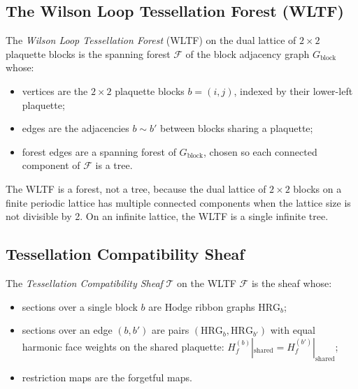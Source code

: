 \subsection{The Wilson Loop Tessellation Forest (WLTF)}
\label{ssec:wltf}

\begin{definition}
\label{def:wltf}
The \emph{Wilson Loop Tessellation Forest} (WLTF) on the dual lattice
of $2\times 2$ plaquette blocks is the spanning forest $\mathcal{F}$
of the block adjacency graph $G_{\mathrm{block}}$ whose:
\begin{itemize}
\item vertices are the $2\times 2$ plaquette blocks $b=(i,j)$, indexed
  by their lower-left plaquette;
\item edges are the adjacencies $b\sim b'$ between blocks sharing a
  plaquette;
\item forest edges are a spanning forest of $G_{\mathrm{block}}$,
  chosen so each connected component of $\mathcal{F}$ is a tree.
\end{itemize}
\end{definition}

\begin{remark}
The WLTF is a forest, not a tree, because the dual lattice of $2\times
2$ blocks on a finite periodic lattice has multiple connected
components when the lattice size is not divisible by 2. On an
infinite lattice, the WLTF is a single infinite tree.
\end{remark}

\subsection{Tessellation Compatibility Sheaf}
\label{ssec:tcs}

\begin{definition}
\label{def:tcs}
The \emph{Tessellation Compatibility Sheaf} $\mathcal{T}$ on the WLTF
$\mathcal{F}$ is the sheaf whose:
\begin{itemize}
\item sections over a single block $b$ are Hodge ribbon graphs
  $\mathrm{HRG}_{b}$;
\item sections over an edge $(b,b')$ are pairs
  $(\mathrm{HRG}_{b},\mathrm{HRG}_{b'})$ with equal harmonic face
  weights on the shared plaquette:
  $H_{f}^{(b)}|_{\mathrm{shared}}=H_{f}^{(b')}|_{\mathrm{shared}}$;
\item restriction maps are the forgetful maps.
\end{itemize}
\end{definition}

